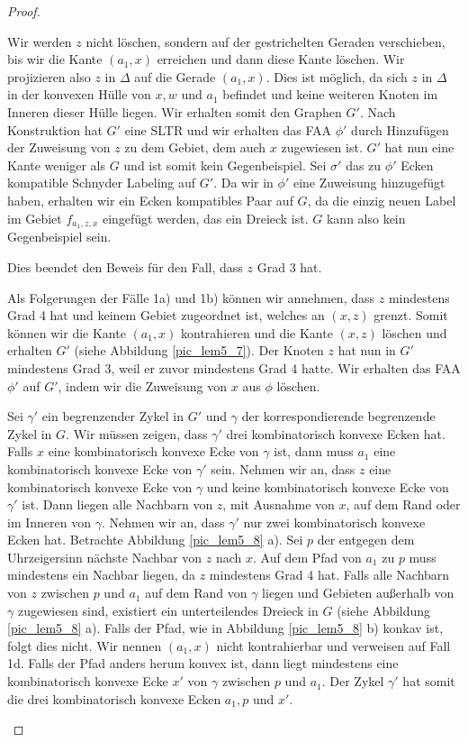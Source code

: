 \begin{proof}
\begin{description}[leftmargin =0pt, font = \rmfamily ]
Wir werden $z$ nicht löschen, sondern auf der gestrichelten Geraden verschieben, bis wir die Kante $(a_1,x)$ erreichen und dann diese Kante löschen. Wir projizieren also $z$ in $\Delta$ auf die Gerade $(a_1,x)$. Dies ist möglich, da sich $z$ in $\Delta$ in der konvexen Hülle von $x,w$ und $a_1$ befindet und keine weiteren Knoten im Inneren dieser Hülle liegen. Wir erhalten somit den Graphen $G'$. Nach Konstruktion hat $G'$ eine SLTR und wir erhalten das FAA $\phi'$ durch Hinzufügen der Zuweisung von $z$ zu dem Gebiet, dem auch $x$ zugewiesen ist. $G'$ hat nun eine Kante weniger als $G$ und ist somit kein Gegenbeispiel. Sei $\sigma'$ das zu $\phi'$ Ecken kompatible Schnyder Labeling auf $G'$. Da wir in $\phi'$ eine Zuweisung hinzugefügt haben, erhalten wir ein Ecken kompatibles Paar auf $G$, da die einzig neuen Label im Gebiet $f_{a_1,z,x}$ eingefügt werden, das ein Dreieck ist. $G$ kann also kein Gegenbeispiel sein.

Dies beendet den Beweis für den Fall, dass $z$ Grad 3 hat.

\item[Fall 1c:] Als Folgerungen der Fälle 1a) und 1b) können wir annehmen, dass $z$ mindestens Grad 4 hat und keinem Gebiet zugeordnet ist, welches an $(x,z)$ grenzt. Somit können wir die Kante $(a_1,x)$ kontrahieren und die Kante $(x,z)$ löschen und erhalten $G'$ (siehe Abbildung \ref{pic_lem5_7}). Der Knoten $z$ hat nun in $G'$ mindestens Grad 3, weil er zuvor mindestens Grad 4 hatte. Wir erhalten das FAA $\phi'$ auf $G'$, indem wir die Zuweisung von $x$ aus $\phi$ löschen. 

Sei $\gamma'$ ein begrenzender Zykel in $G'$ und $\gamma$ der korrespondierende begrenzende Zykel in $G$. Wir müssen zeigen, dass $\gamma'$ drei kombinatorisch konvexe Ecken hat. Falls $x$ eine kombinatorisch konvexe Ecke von $\gamma$ ist, dann muss $a_1$ eine kombinatorisch konvexe Ecke von $\gamma'$ sein. Nehmen wir an, dass $z$ eine kombinatorisch konvexe Ecke von $\gamma$ und keine kombinatorisch konvexe Ecke von $\gamma'$ ist. Dann liegen alle Nachbarn von $z$, mit Ausnahme von $x$, auf dem Rand oder im Inneren von $\gamma$. Nehmen wir an, dass $\gamma'$ nur zwei kombinatorisch konvexe Ecken hat. Betrachte Abbildung \ref{pic_lem5_8} a). Sei $p$ der entgegen dem Uhrzeigersinn nächste Nachbar von $z$ nach $x$. Auf dem Pfad von $a_1$ zu $p$ muss mindestens ein Nachbar liegen, da $z$ mindestens Grad 4 hat. Falls alle Nachbarn von $z$ zwischen $p$ und $a_1$ auf dem Rand von $\gamma$ liegen und Gebieten außerhalb von $\gamma$ zugewiesen sind, existiert ein unterteilendes Dreieck in $G$ (siehe Abbildung \ref{pic_lem5_8} a). Falls der Pfad, wie in Abbildung \ref{pic_lem5_8} b) konkav ist, folgt dies nicht. Wir nennen $(a_1,x)$ nicht kontrahierbar und verweisen auf Fall 1d. Falls der Pfad anders herum konvex ist, dann liegt mindestens eine kombinatorisch konvexe Ecke $x'$ von $\gamma$ zwischen $p$ und $a_1$. Der Zykel $\gamma'$ hat somit die drei kombinatorisch konvexe Ecken $a_1,p$ und $x'$. 


\end{description}
\end{proof}
